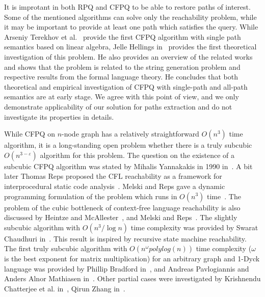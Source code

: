 It is improtant in both RPQ and CFPQ to be able to restore paths of interest.
Some of the mentioned algorithms can solve only the reachability problem, while it may be important to provide at least one path which satisfies the query.
While Arseniy Terekhov et al.~\cite{10.1145/3398682.3399163} provide the first CFPQ algorithm with single path semantics based on linear algebra, Jelle Hellings in~\cite{HellSinglePath} provides the first theoretical investigation of this problem.
He also provides an overview of the related works and shows that the problem is related to the string generation problem and respective results from the formal language theory.
He concludes that both theoretical and empirical investigation of CFPQ with single-path and all-path semantics are at early stage.
We agree with this point of view, and we only demonstrate applicability of our solution for paths extraction and do not investigate its properties in details.

While CFPQ on $n$-node graph has a relatively straightforward $O(n^3)$ time algorithm, it is a long-standing open problem whether there is a truly  subcubic $O(n^{3-\varepsilon})$ algorithm for this problem.
The question on the existence of a subcubic CFPQ algorithm was stated by Mihalis Yannakakis in 1990 in~\cite{Yannakakis}.
A bit later Thomas Reps proposed the CFL reachability as a framework for interprocedural static code analysis~\cite{10.5555/271338.271343}.
Melski and Reps gave a dynamic programming formulation of the problem which runs in $O(n^3)$ time~\cite{10.1145/258993.259006}.
The problem of the cubic bottleneck of context-free language reachability is also discussed by Heintze and McAllester~\cite{10.5555/788019.788876}, and Melski and Reps~\cite{10.1145/258993.259006}.
The slightly subcubic algorithm with $O(n^3/\log{n})$ time complexity was provided by Swarat Chaudhuri in~\cite{10.1145/1328897.1328460}.
This result is inspired by recursive state machine reachability.
The first truly subcubic algorithm with $O(n^\omega polylog(n))$ time complexity ($\omega$ is the best exponent for matrix multiplication) for an arbitrary graph and 1-Dyck language was provided by Phillip Bradford in~\cite{8249039}, and Andreas Pavlogiannis and Anders Alnor Mathiasen in~\cite{pavlogiannis2020finegrained}.
Other partial cases were investigated by Krishnendu Chatterjee et al. in~\cite{10.1145/3158118}, Qirun Zhang in~\cite{zhang2020conditional}.

